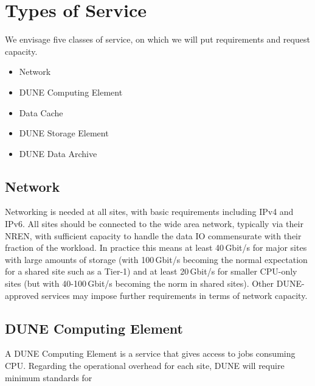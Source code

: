 \documentclass[../main-v1.tex]{subfiles}
\begin{document}
\section{Types of Service}
\label{sec:cm:types_of_service}

We envisage five classes of service, on which we will put requirements and request capacity.

\begin{itemize}
    \item Network
    \item DUNE Computing Element
    \item Data Cache
    \item DUNE Storage Element
    \item DUNE Data Archive
\end{itemize}

\subsection{Network}
\label{sec:cm:network}

Networking is needed at all sites, with basic requirements including IPv4 and IPv6. %
All sites should be connected to the wide area network, typically via their NREN, with sufficient capacity to handle the data IO commensurate with their fraction of the workload. In practice this means at least 40\,Gbit/s for major sites with large amounts of storage (with 100\,Gbit/s becoming the normal expectation for a shared site such as a  Tier-1) and at least 20\,Gbit/s for smaller CPU-only sites (but with 40-100\,Gbit/s becoming the norm in shared sites).
Other DUNE-approved services may impose further requirements in terms of network capacity. %

\subsection{DUNE Computing Element}
\label{sec:cm:dce}

A DUNE Computing Element is a service that gives access to jobs consuming CPU. %
Regarding the operational overhead %
for each site, DUNE will require  minimum standards for
\end{document}
